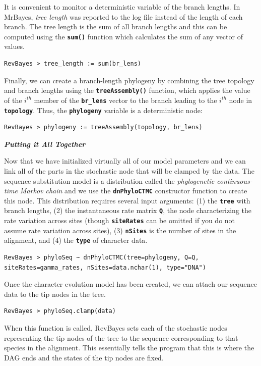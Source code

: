 \documentclass[11pt]{article}
\newcommand{\cl}[1]{{\texttt{\textbf{#1}}}}
\begin{document}
It is convenient to monitor a deterministic variable of the branch lengths. In MrBayes, \textit{tree length} was reported to the log file instead of the length of each branch. The tree length is the sum of all branch lengths and this can be computed using the \cl{sum()} function which calculates the sum of any vector of values.
{\tt \begin{snugshade*}
\begin{lstlisting}
RevBayes > tree_length := sum(br_lens)
\end{lstlisting}
\end{snugshade*}}

Finally, we can create a branch-length phylogeny by combining the tree topology and branch lengths using the \cl{treeAssembly()} function, which applies the value of the $i^{th}$ member of the \cl{br\_lens} vector to the branch leading to the $i^{th}$ node in \cl{topology}. Thus, the \cl{phylogeny} variable is a deterministic node: 

{\tt \begin{snugshade*}
\begin{lstlisting}
RevBayes > phylogeny := treeAssembly(topology, br_lens)
\end{lstlisting}
\end{snugshade*}}



\textbf{\textit{Putting it All Together}}

Now that we have initialized virtually all of our model parameters and we can link all of the parts in the stochastic node that will be clamped by the data. 
The sequence substitution model is a distribution called the \textit{phylogenetic continuous-time Markov chain} and we use the \cl{dnPhyloCTMC} constructor function to create this node.
This distribution requires several input arguments: (1) the \cl{tree} with branch lengths, (2) the instantaneous rate matrix \cl{Q}, the node characterizing the rate variation across sites (though \cl{siteRates} can be omitted if you do not assume rate variation across sites), (3) \cl{nSites} is the number of sites in the alignment, and (4) the \cl{type} of character data.
{\tt \begin{snugshade*}
\begin{lstlisting}
RevBayes > phyloSeq ~ dnPhyloCTMC(tree=phylogeny, Q=Q, siteRates=gamma_rates, nSites=data.nchar(1), type="DNA")
\end{lstlisting}
\end{snugshade*}}


Once the character evolution model has been created, we can attach our sequence data to the tip nodes in the tree.
{\tt \begin{snugshade*}
\begin{lstlisting}
RevBayes > phyloSeq.clamp(data)
\end{lstlisting}
\end{snugshade*}}
When this function is called, RevBayes sets each of the stochastic nodes representing the tip nodes of the tree to the sequence corresponding to that species in the alignment. 
This essentially tells the program that this is where the DAG ends and the states of the tip nodes are fixed. 
\end{document}
